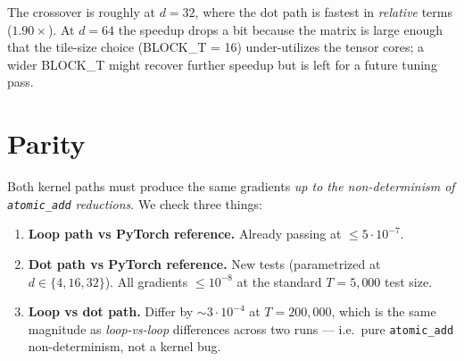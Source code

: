 \documentclass[11pt,a4paper]{article}
\begin{document}
\begin{center}
\end{center}

The crossover is roughly at $d = 32$, where the dot path is fastest in
\emph{relative} terms ($1.90\times$). At $d = 64$ the speedup drops a
bit because the matrix is large enough that the tile-size choice
(BLOCK\_T = 16) under-utilizes the tensor cores; a wider BLOCK\_T
might recover further speedup but is left for a future tuning pass.

\section{Parity}

Both kernel paths must produce the same gradients \emph{up to the
non-determinism of \texttt{atomic\_add} reductions}. We check three
things:

\begin{enumerate}
  \item \textbf{Loop path vs PyTorch reference.} Already passing at
        $\le 5 \cdot 10^{-7}$.
  \item \textbf{Dot path vs PyTorch reference.} New tests
        (parametrized at $d \in \{4, 16, 32\}$). All gradients
        $\le 10^{-8}$ at the standard $T = 5{,}000$ test size.
  \item \textbf{Loop vs dot path.} Differ by $\sim 3 \cdot 10^{-4}$ at
        $T = 200{,}000$, which is the same magnitude as
        \emph{loop-vs-loop} differences across two runs ---
        i.e.\ pure \texttt{atomic\_add} non-determinism, not a kernel
        bug.
\end{enumerate}
\end{document}
